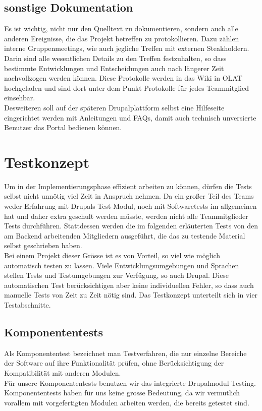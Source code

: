 \documentclass{swp}
\begin{document}
\subsection{sonstige Dokumentation}
Es ist wichtig, nicht nur den Quelltext zu dokumentieren, sondern auch alle anderen Ereignisse, die das Projekt betreffen zu protokollieren. Dazu z\"ahlen interne Gruppenmeetings, wie auch jegliche Treffen mit externen Steakholdern. Darin sind alle wesentlichen Details zu den Treffen festzuhalten, so dass bestimmte Entwicklungen und Entscheidungen auch nach l\"angerer Zeit nachvollzogen werden k\"onnen. Diese Protokolle werden in das Wiki in OLAT hochgeladen und sind dort unter dem Punkt \glqq Protokolle\grqq{} f\"ur jedes Teammitglied einsehbar.\\
Desweiteren soll auf der sp\"ateren Drupalplattform selbst eine Hilfeseite eingerichtet werden mit Anleitungen und FAQs, damit auch technisch unversierte Benutzer das Portal bedienen k\"onnen.

\newpage
\section{Testkonzept}
Um in der Implementierungsphase effizient arbeiten zu k\"onnen, d\"urfen die Tests selbst nicht unn\"otig viel Zeit in Anspruch nehmen. Da ein gro{\ss}er Teil des Teams weder Erfahrung mit Drupals Test-Modul, noch mit Softwaretests im allgemeinen hat und daher extra geschult werden m\"usste, werden nicht alle Teammitglieder Tests durchf\"uhren. Stattdessen werden die im folgenden erl\"auterten Tests von den am Backend arbeitenden Mitgliedern ausgef\"uhrt, die das zu testende Material selbst geschrieben haben.\\
Bei einem Projekt dieser Gr\"o{ss}e ist es von Vorteil, so viel wie m\"oglich automatisch testen zu lassen. Viele Entwicklungsumgebungen und Sprachen stellen Tests und Testumgebungen zur Verf\"ugung, so auch Drupal. Diese automatischen Test ber\"ucksichtigen aber keine individuellen Fehler, so dass auch manuelle Tests von Zeit zu Zeit n\"otig sind. Das Testkonzept unterteilt sich in vier Testabschnitte.
\subsection{Komponententests}
Als Komponententest bezeichnet man Testverfahren, die nur einzelne Bereiche der Software auf ihre Funktionalit\"at pr\"ufen, ohne Ber\"ucksichtigung der Kompatibilit\"at mit anderen Modulen.\\
F\"ur unsere Komponententests benutzen wir das integrierte Drupalmodul Testing.\\
Komponententests haben f\"ur uns keine gro{ss}e Bedeutung, da wir vermutlich vorallem mit vorgefertigten Modulen arbeiten werden, die bereits getestet sind.
\end{document}
